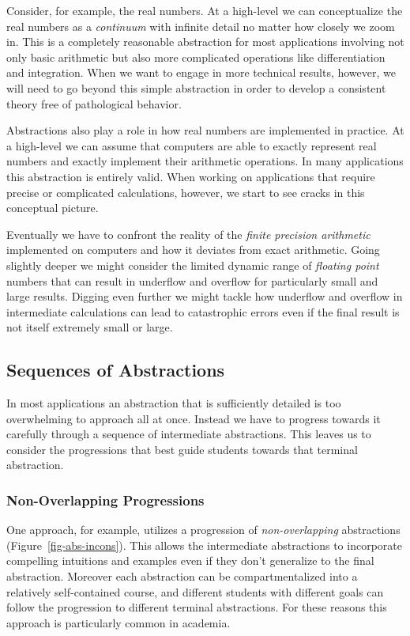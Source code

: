 \documentclass[
  letterpaper,
  DIV=11,
  numbers=noendperiod]{scrartcl}
\begin{document}
Consider, for example, the real numbers. At a high-level we can
conceptualize the real numbers as a \emph{continuum} with infinite
detail no matter how closely we zoom in. This is a completely reasonable
abstraction for most applications involving not only basic arithmetic
but also more complicated operations like differentiation and
integration. When we want to engage in more technical results, however,
we will need to go beyond this simple abstraction in order to develop a
consistent theory free of pathological behavior.

Abstractions also play a role in how real numbers are implemented in
practice. At a high-level we can assume that computers are able to
exactly represent real numbers and exactly implement their arithmetic
operations. In many applications this abstraction is entirely valid.
When working on applications that require precise or complicated
calculations, however, we start to see cracks in this conceptual
picture.

Eventually we have to confront the reality of the \emph{finite precision
arithmetic} implemented on computers and how it deviates from exact
arithmetic. Going slightly deeper we might consider the limited dynamic
range of \emph{floating point} numbers that can result in underflow and
overflow for particularly small and large results. Digging even further
we might tackle how underflow and overflow in intermediate calculations
can lead to catastrophic errors even if the final result is not itself
extremely small or large.

\hypertarget{sequences-of-abstractions}{%
\subsection{Sequences of Abstractions}\label{sequences-of-abstractions}}

In most applications an abstraction that is sufficiently detailed is too
overwhelming to approach all at once. Instead we have to progress
towards it carefully through a sequence of intermediate abstractions.
This leaves us to consider the progressions that best guide students
towards that terminal abstraction.

\hypertarget{non-overlapping-progressions}{%
\subsubsection{Non-Overlapping
Progressions}\label{non-overlapping-progressions}}

One approach, for example, utilizes a progression of
\emph{non-overlapping} abstractions (Figure~\ref{fig-abs-incons}). This
allows the intermediate abstractions to incorporate compelling
intuitions and examples even if they don't generalize to the final
abstraction. Moreover each abstraction can be compartmentalized into a
relatively self-contained course, and different students with different
goals can follow the progression to different terminal abstractions. For
these reasons this approach is particularly common in academia.
\end{document}
